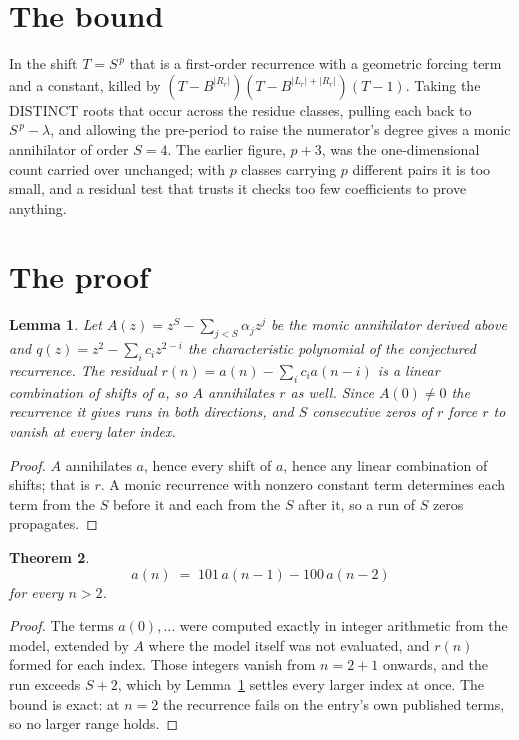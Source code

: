 \documentclass[11pt,a4paper]{article}
\theoremstyle{plain}
\newtheorem{theorem}{Theorem}
\newtheorem{lemma}[theorem]{Lemma}
\theoremstyle{definition}
\begin{document}
\section{The bound}

In the shift $T=S^{\,p}$ that is a first-order recurrence with a geometric forcing term and a
constant, killed by $(T-B^{|R_r|})(T-B^{|L_r|+|R_r|})(T-1)$. Taking the DISTINCT roots that
occur across the residue classes, pulling each back to $S^{\,p}-\lambda$, and allowing the
pre-period to raise the numerator's degree gives a monic annihilator of order $S=4$. The
earlier figure, $p+3$, was the one-dimensional count carried over unchanged; with $p$ classes
carrying $p$ different pairs it is too small, and a residual test that trusts it checks too few
coefficients to prove anything.

\section{The proof}

\begin{lemma}\label{lem:crit}
Let $A(z)=z^S-\sum_{j<S}\alpha_jz^{j}$ be the monic annihilator derived above and
$q(z)=z^{2}-\sum_ic_iz^{2-i}$ the characteristic polynomial of the conjectured
recurrence. The residual $r(n)=a(n)-\sum_ic_ia(n-i)$ is a linear combination of shifts of $a$,
so $A$ annihilates $r$ as well. Since $A(0)\ne0$ the recurrence it gives runs in both
directions, and $S$ consecutive zeros of $r$ force $r$ to vanish at every later index.
\end{lemma}

\begin{proof}
$A$ annihilates $a$, hence every shift of $a$, hence any linear combination of shifts; that is
$r$. A monic recurrence with nonzero constant term determines each term from the $S$ before it
and each from the $S$ after it, so a run of $S$ zeros propagates.
\end{proof}

\begin{theorem}
\[
a(n)\;=\;101\,a(n-1) - 100\,a(n-2)
\]
for every $n>2$.
\end{theorem}

\begin{proof}
The terms $a(0),\dots$ were computed exactly in integer arithmetic from the model, extended by
$A$ where the model itself was not evaluated, and $r(n)$ formed for each index. Those integers
vanish from $n=2+1$ onwards, and the run exceeds $S+2$, which by
Lemma~\ref{lem:crit} settles every larger index at once. The bound is exact: at $n=2$ the recurrence fails on the entry's own published terms, so no larger range holds.
\end{proof}
\end{document}
